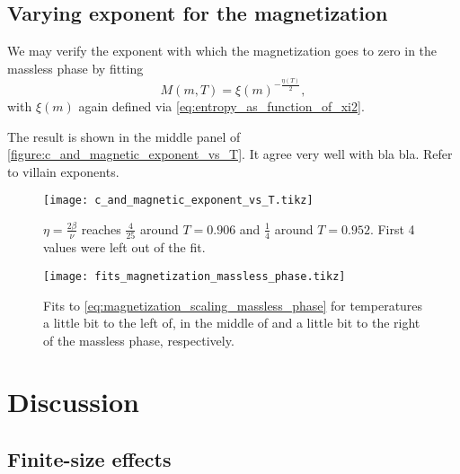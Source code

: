 \subsection{Varying exponent for the magnetization}
We may verify the exponent with which the magnetization goes to zero in the massless phase by fitting
\begin{equation}\label{eq:magnetization_scaling_massless_phase}
  M(m, T) = \xi(m)^{-\frac{\eta(T)}{2}},
\end{equation}
with $\xi(m)$ again defined via \autoref{eq:entropy_as_function_of_xi2}.

The result is shown in the middle panel of \autoref{figure:c_and_magnetic_exponent_vs_T}.
It agree very well with bla bla.
Refer to villain exponents.


\begin{figure}
  \centering
  \texttt{[image: c\_and\_magnetic\_exponent\_vs\_T.tikz]}
  \caption{$\eta = \frac{2\beta}{\nu}$ reaches $\frac{4}{25}$ around $T = 0.906$ and $\frac{1}{4}$ around $T = 0.952$.
  First 4 values were left out of the fit.
}\label{figure:c_and_magnetic_exponent_vs_T}
\end{figure}


\begin{figure}
  \centering
  \texttt{[image: fits\_magnetization\_massless\_phase.tikz]}
  \caption{Fits to \autoref{eq:magnetization_scaling_massless_phase} for temperatures a little bit to the left of,
  in the middle of and a little bit to the right of the massless phase,
  respectively.
}\label{figure:fits_magnetization_massless_phase}
\end{figure}

\section{Discussion}

\subsection{Finite-size effects}

